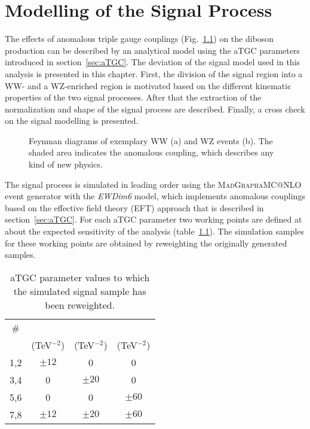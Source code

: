 \chapter{Modelling of the Signal Process}
\label{chap:signal}
The effects of anomalous triple gauge couplings (Fig.~\ref{fig:signal:fy_atgc}) on the diboson production can be described by an analytical model using the aTGC parameters introduced in section~\ref{sec:aTGC}. The deviation of the signal model used in this analysis is presented in this chapter. First, the division of the signal region into a WW- and a WZ-enriched region is motivated based on the different kinematic properties of the two signal processes. After that the extraction of the normalization and shape of the signal process are described. Finally, a cross check on the signal modelling is presented.\\
\begin{figure}
	\centering
	\caption[Feynman diagrams of two exemplary signal events]{Feynman diagrams of exemplary WW (a) and WZ events (b). The shaded area indicates the anomalous coupling, which describes any kind of new physics.}
	\label{fig:signal:fy_atgc}
\end{figure}

\noindent The signal process is simulated in leading order using the \textsc{MadGraph\textunderscore aMC@NLO} event generator with the \textit{EWDim6} model, which implements anomalous couplings based on the effective field theory (EFT) approach that is described in section~\ref{sec:aTGC}. For each aTGC parameter two working points are defined at about the expected sensitivity of the analysis (table~\ref{tab:signal:aTGCpoints}). The simulation samples for these working points are obtained by reweighting the originally generated samples.
\begin{table}
	\centering
	\caption[aTGC working points]{aTGC parameter values to which the simulated signal sample has been reweighted.}
	\label{tab:signal:aTGCpoints}
	\begin{tabular}{cccc}
	\hline
	\# & \Tcwww & \Tccw & \Tcb \\
	\ & (TeV$^{-2}$) & (TeV$^{-2}$) & (TeV$^{-2}$)\\
	\hline
	1,2 &  $\pm 12$ & 0 & 0\\
	3,4 & 0 &  $\pm 20$ & 0\\
	5,6 & 0 & 0 &  $\pm 60$\\
	7,8 &	$\pm 12$ & $\pm 20$ & $\pm 60$\\
	\hline
	\end{tabular}
\end{table}

